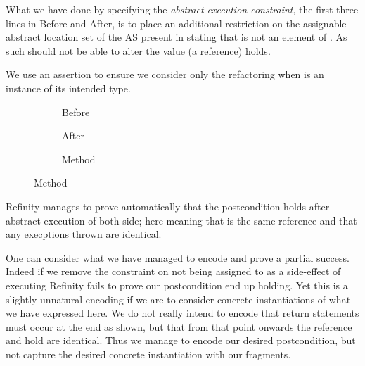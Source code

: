 What we have done by specifying the \emph{abstract execution constraint}, the first three lines in Before and After, is to place an additional restriction on the assignable abstract
location set  of the AS present in  stating that  is not an element of . As such  should not be able to alter the value (a reference)
 holds.

We use an assertion to ensure we consider only the refactoring when  is an instance of its intended type.

\begin{figure}[!h]
  \centering
  \begin{subfigure}[b]{.34\linewidth}
    
    \caption{Before}
    \label{lst:ExtractVariable-refinity-before}
  \end{subfigure}\hspace{1cm}
  \begin{subfigure}[b]{.34\linewidth}
    
    \caption{After}
    \label{lst:ExtractVariable-refinity-after}
  \end{subfigure}\vspace{1mm}
  \begin{subfigure}[b]{.65\linewidth}
    
    \caption{Method}
    \label{lst:ExtractVariable-refinity-method}
  \end{subfigure}
\label{lst:ExtractVariable-refinity}
\end{figure}

Refinity manages to prove automatically that the postcondition  holds after abstract execution of both side; here meaning that
 is the same reference and that any execptions thrown are identical.

One can consider what we have managed to encode and prove a partial success.
Indeed if we remove the constraint on  not being assigned to as a side-effect of executing   Refinity fails to prove our postcondition end up holding.
Yet this is a slightly unnatural encoding if we are to consider concrete instantiations of what we have expressed here.
We do not really intend to encode that return statements must occur at the end as shown, but that from that point onwards the reference  and  hold
are identical. Thus we manage to encode our desired postcondition, but not capture the desired concrete instantiation with our fragments.

